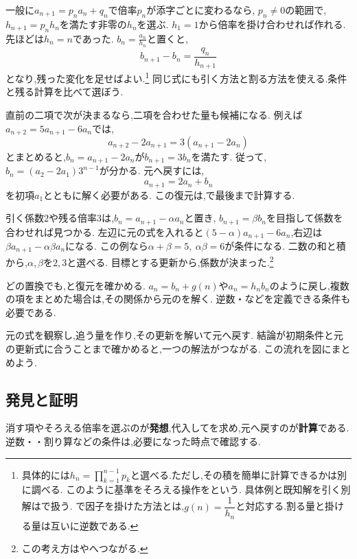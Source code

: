 一般に$a_{n+1}=p_na_n+q_n$で倍率$p_n$が添字ごとに変わるなら,
$p_n\ne0$の範囲で,$h_{n+1}=p_nh_n$を満たす非零の$h_n$を選ぶ.
$h_1=1$から倍率を掛け合わせれば作れる.先ほどは$h_n=n$であった.
$b_n=\frac{a_n}{h_n}$と置くと,
\[
  b_{n+1}-b_n=\frac{q_n}{h_{n+1}}
\]
となり,残った変化を足せばよい.\footnote{具体的には$h_n=\prod_{k=1}^{n-1}p_k$と選べる.ただし,その積を簡単に計算できるかは別に調べる.
  このように基準をそろえる操作を\textbf{}という.
  具体例と既知解を引く別解はで扱う.
  で因子を掛けた方法とは,$g(n)=\dfrac{1}{h_n}$と対応する.割る量と掛ける量は互いに逆数である.}
同じ式にも引く方法と割る方法を使える.条件と残る計算を比べて選ぼう.

直前の二項で次が決まるなら,二項を合わせた量も候補になる.
例えば$a_{n+2}=5a_{n+1}-6a_n$では,
\[
  a_{n+2}-2a_{n+1}=3(a_{n+1}-2a_n)
\]
とまとめると,$b_n=a_{n+1}-2a_n$が$b_{n+1}=3b_n$を満たす.
従って,$b_n=(a_2-2a_1)3^{n-1}$が分かる.
元へ戻すには,
\[
  a_{n+1}=2a_n+b_n
\]
を初項$a_1$とともに解く必要がある.
この復元は,で最後まで計算する.

引く係数$2$や残る倍率$3$は,$b_n=a_{n+1}-\alpha a_n$と置き,
$b_{n+1}=\beta b_n$を目指して係数を合わせれば見つかる.
左辺に元の式を入れると$(5-\alpha)a_{n+1}-6a_n$,右辺は$\beta a_{n+1}-\alpha\beta a_n$になる.
この例なら$\alpha+\beta=5,\ \alpha\beta=6$が条件になる.
二数の和と積から,$\alpha,\beta$を$2,3$と選べる.
目標とする更新から,係数が決まった.\footnote{この考え方はやへつながる.}

どの置換でも,と復元を確かめる.
$a_n=b_n+g(n)$や$a_n=h_nb_n$のように戻し,複数の項をまとめた場合は,その関係から元のを解く.
逆数・などを定義できる条件も必要である.

元の式を観察し,追う量を作り,その更新を解いて元へ戻す.
結論が初期条件と元の更新式に合うことまで確かめると,一つの解法がつながる.
この流れを図にまとめよう.
\BookFigApproach

\subsection{発見と証明}

消す項やそろえる倍率を選ぶのが\textbf{発想},代入してを求め,元へ戻すのが\textbf{計算}である.
逆数・・割り算などの条件は,必要になった時点で確認する.

